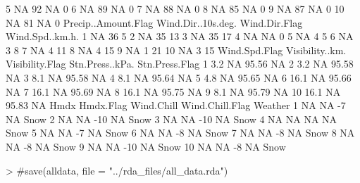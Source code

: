 \documentclass[11pt, a4paper]{article}
\begin{document}
\begin{Schunk}
\begin{Soutput}
5                   NA          92           NA                   0
6                   NA          89           NA                   0
7                   NA          88           NA                   0
8                   NA          85           NA                   0
9                   NA          87           NA                   0
10                  NA          81           NA                   0
   Precip..Amount.Flag Wind.Dir..10s.deg. Wind.Dir.Flag Wind.Spd..km.h.
1                   NA                 36                             5
2                   NA                 35                            13
3                   NA                 35                            17
4                   NA                 NA                             0
5                   NA                  4                             5
6                   NA                  3                             8
7                   NA                  4                            11
8                   NA                  4                            15
9                   NA                  1                            21
10                  NA                  3                            15
   Wind.Spd.Flag Visibility..km. Visibility.Flag Stn.Press..kPa. Stn.Press.Flag
1                            3.2              NA           95.56             NA
2                            3.2              NA           95.58             NA
3                            8.1              NA           95.58             NA
4                            8.1              NA           95.64             NA
5                            4.8              NA           95.65             NA
6                           16.1              NA           95.66             NA
7                           16.1              NA           95.69             NA
8                           16.1              NA           95.75             NA
9                            8.1              NA           95.79             NA
10                          16.1              NA           95.83             NA
   Hmdx Hmdx.Flag Wind.Chill Wind.Chill.Flag Weather
1    NA        NA         -7              NA    Snow
2    NA        NA        -10              NA    Snow
3    NA        NA        -10              NA    Snow
4    NA        NA         NA              NA    Snow
5    NA        NA         -7              NA    Snow
6    NA        NA         -8              NA    Snow
7    NA        NA         -8              NA    Snow
8    NA        NA         -8              NA    Snow
9    NA        NA        -10              NA    Snow
10   NA        NA         -8              NA    Snow
\end{Soutput}
\end{Schunk}




\begin{Schunk}
\begin{Sinput}
> #save(alldata, file = "../rda_files/all_data.rda")
\end{Sinput}
\end{Schunk}
\end{document}
